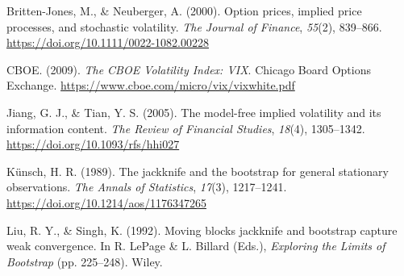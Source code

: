 \documentclass[12pt, a4paper]{article}
\theoremstyle{plain}
\theoremstyle{definition}
\begin{document}
Britten-Jones, M., \& Neuberger, A. (2000). Option prices, implied price processes, and stochastic volatility. \textit{The Journal of Finance}, \textit{55}(2), 839--866. \url{https://doi.org/10.1111/0022-1082.00228}

CBOE. (2009). \textit{The CBOE Volatility Index: VIX}. Chicago Board Options Exchange. \url{https://www.cboe.com/micro/vix/vixwhite.pdf}

Jiang, G. J., \& Tian, Y. S. (2005). The model-free implied volatility and its information content. \textit{The Review of Financial Studies}, \textit{18}(4), 1305--1342. \url{https://doi.org/10.1093/rfs/hhi027}

Künsch, H. R. (1989). The jackknife and the bootstrap for general stationary observations. \textit{The Annals of Statistics}, \textit{17}(3), 1217--1241. \url{https://doi.org/10.1214/aos/1176347265}

Liu, R. Y., \& Singh, K. (1992). Moving blocks jackknife and bootstrap capture weak convergence. In R. LePage \& L. Billard (Eds.), \textit{Exploring the Limits of Bootstrap} (pp. 225--248). Wiley.

\endgroup
\end{document}
